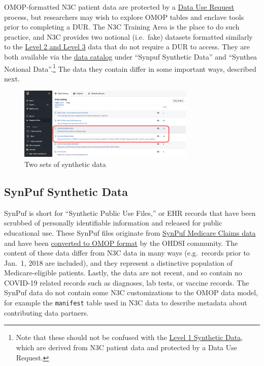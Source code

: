 \documentclass[
  letterpaper,
  DIV=11,
  numbers=noendperiod]{scrreprt}
\begin{document}
OMOP-formatted N3C patient data are protected by a
\protect\hyperlink{data-use-request}{Data Use Request} process, but
researchers may wish to explore OMOP tables and enclave tools prior to
completing a DUR. The N3C Training Area is the place to do such
practice, and N3C provides two notional (i.e.~fake) datasets formatted
similarly to the \protect\hyperlink{about-the-data}{Level 2 and Level 3}
data that do not require a DUR to access. They are both available via
the \protect\hyperlink{data-catalog}{data catalog} under ``Synpuf
Synthetic Data'' and ``Synthea Notional Data''.\footnote{Note that these
  should not be confused with the
  \protect\hyperlink{level-one-data}{Level 1 Synthetic Data}, which are
  derived from N3C patient data and protected by a Data Use Request.}
The data they contain differ in some important ways, described next.

\begin{figure}

{\centering \includegraphics[width=0.75\textwidth,height=\textheight]{chapters/images/support/image-19-synethic-datasets.png}

}

\caption{\label{fig-support-synethic-datasets}Two sets of synthetic
data}

\end{figure}

\hypertarget{sec-support-notional-synpuf}{%
\subsection{SynPuf Synthetic Data}\label{sec-support-notional-synpuf}}

SynPuf is short for ``Synthetic Public Use Files,'' or EHR records that
have been scrubbed of personally identifiable information and released
for public educational use. These SynPuf files originate from
\href{https://www.cms.gov/Research-Statistics-Data-and-Systems/Downloadable-Public-Use-Files/SynPUFs}{SynPuf
Medicare Claims data} and have been
\href{https://forums.ohdsi.org/t/synpuf/4936}{converted to OMOP format}
by the OHDSI community. The content of these data differ from N3C data
in many ways (e.g.~records prior to Jan.~1, 2018 are included), and they
represent a distinctive population of Medicare-eligible patients.
Lastly, the data are not recent, and so contain no COVID-19 related
records such as diagnoses, lab tests, or vaccine records. The SynPuf
data do not contain some N3C customizations to the OMOP data model, for
example the \texttt{manifest} table used in N3C data to describe
metadata about contributing data partners.
\end{document}
